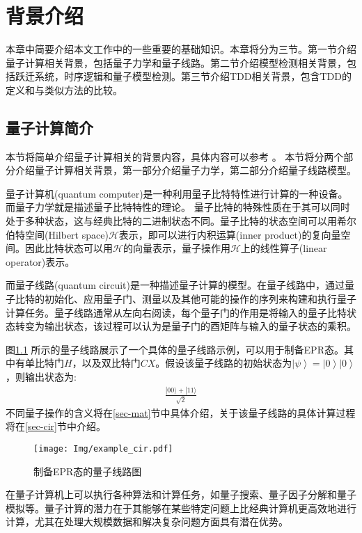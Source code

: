 \chapter{背景介绍}
本章中简要介绍本文工作中的一些重要的基础知识。本章将分为三节。第一节介绍量子计算相关背景，包括量子力学和量子线路。第二节介绍模型检测相关背景，包括跃迁系统，时序逻辑和量子模型检测。第三节介绍TDD相关背景，包含TDD的定义和与类似方法的比较。
\section{量子计算简介}
本节将简单介绍量子计算相关的背景内容，具体内容可以参考
\citep{nielsen2010quantum}。
本节将分两个部分介绍量子计算相关背景，第一部分介绍量子力学，第二部分介绍量子线路模型。

量子计算机(quantum computer)是一种利用量子比特特性进行计算的一种设备。
而量子力学就是描述量子比特特性的理论。
量子比特的特殊性质在于其可以同时处于多种状态，这与经典比特的二进制状态不同。量子比特的状态空间可以用希尔伯特空间(Hilbert space)\(\mathcal{H}\)表示\citep{nielsen2010quantum}，即可以进行内积运算(inner product)的复向量空间。因此比特状态可以用\(\mathcal{H}\)的向量表示，量子操作用\(\mathcal{H}\)上的线性算子(linear operator)表示。

而量子线路(quantum circuit)是一种描述量子计算的模型\citep{nielsen2010quantum}。在量子线路中，通过量子比特的初始化、应用量子门、测量以及其他可能的操作的序列来构建和执行量子计算任务。量子线路通常从左向右阅读，每个量子门的作用是将输入的量子比特状态转变为输出状态，该过程可以认为是量子门的酉矩阵与输入的量子状态的乘积。
\begin{example}
    \label{ex-epr}
    图\ref{fig:example_cir} 所示的量子线路展示了一个具体的量子线路示例，可以用于制备EPR态。其中有单比特门\(H\)，以及双比特门\(CX\)。假设该量子线路的初始状态为\(\left|\psi\right\rangle=\left|0\right\rangle\left|0\right\rangle\)，则输出状态为:
\begin{align}
   \frac{|00\rangle+|11\rangle}{\sqrt{2}}
\end{align}
不同量子操作的含义将在\ref{sec-mat}节中具体介绍，关于该量子线路的具体计算过程将在\ref{sec-cir}节中介绍。
\end{example}
\begin{figure}[!htbp]
    \centering
    \texttt{[image: Img/example\_cir.pdf]}
    \caption{制备EPR态的量子线路图}
    \label{fig:example_cir}
\end{figure}



在量子计算机上可以执行各种算法和计算任务，如量子搜索\citep{Grover_1996}、量子因子分解\citep{Shor}和量子模拟\citep{Feynman}等。量子计算的潜力在于其能够在某些特定问题上比经典计算机更高效地进行计算，尤其在处理大规模数据和解决复杂问题方面具有潜在优势。

